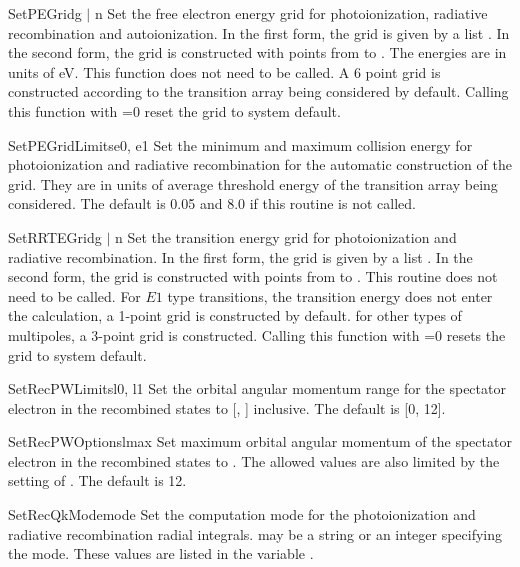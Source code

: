 \begin{fundesc}{SetPEGrid}{g $\mid$ n}
Set the free electron energy grid for photoionization, radiative recombination
and autoionization. In the first form, the grid is given by a list
. In the second form, the grid is constructed with  points from
 to . The energies are in units of eV. This function does not
need to be called. A 6 point grid is constructed according to the transition
array being considered by default. Calling this function with =0 reset
the grid to system default.
\end{fundesc}

\begin{fundesc}{SetPEGridLimits}{e0, e1}
Set the minimum and maximum collision energy for photoionization and radiative
recombination for the automatic construction of the grid. They are in units of
average threshold energy of the transition array being considered. The default
is 0.05 and 8.0 if this routine is not called.
\end{fundesc}

\begin{fundesc}{SetRRTEGrid}{g $\mid$ n}
Set the transition energy grid for photoionization and radiative recombination.
In the first form, the grid is given by a list . In the second form, the
grid is constructed with  points from  to . This routine
does not need to be called. For $E1$ type transitions, the transition energy
does not enter the calculation, a 1-point grid is constructed by default. for
other types of multipoles, a 3-point grid is constructed. Calling this function
with =0 resets the grid to system default.
\end{fundesc}

\begin{fundesc}{SetRecPWLimits}{l0, l1}
Set the orbital angular momentum range for the spectator electron in the
recombined states to [, ] inclusive. The default is [0, 12].
\end{fundesc}

\begin{fundesc}{SetRecPWOptions}{lmax}
Set maximum orbital angular momentum of the spectator electron in the
recombined states to . The allowed values are also limited by the
setting of . The default is 12.
\end{fundesc}

\begin{fundesc}{SetRecQkMode}{mode}
Set the computation mode for the photoionization and radiative recombination
radial integrals.  may be a string or an integer specifying the
mode. These values are listed in the variable .
\end{fundesc}

